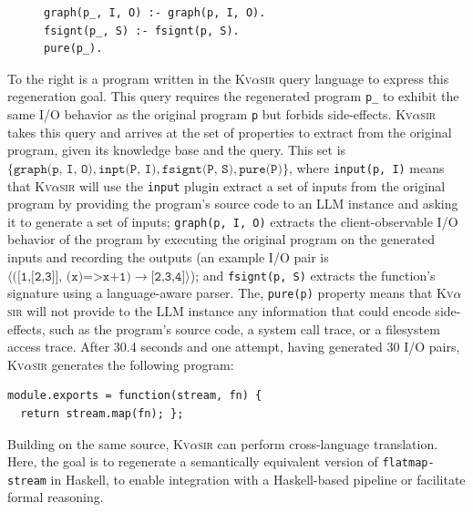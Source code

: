 \documentclass[nonacm,sigplan,review]{acmart}
\newcommand{\sys}{{\scshape Kv{$\alpha$}sir}\xspace}
\newcommand{\ttt}[1]{\texttt{#1}\xspace}
\begin{document}
\begin{figure}
\vspace{-10pt}
\hspace{-10pt}
\begin{verbatim}
graph(p_, I, O) :- graph(p, I, O).
fsignt(p_, S) :- fsignt(p, S).
pure(p_).
\end{verbatim}
\end{figure}
To the right is a program written in the \sys query language to express 
this regeneration goal.
This query requires the regenerated program \ttt{p\_} to exhibit the same I/O behavior as the original program \ttt{p}
but forbids side-effects.
\sys takes this query and arrives at the set of properties to extract from the
original program, given its knowledge base and the query.
This set is $\{\ttt{graph(p, I, O)}, \ttt{inpt(P, I)}, \ttt{fsignt(P, S)}, \ttt{pure(P)}\}$, where
\ttt{input(p, I)} means that \sys will use the \ttt{input} plugin extract a set of inputs from the original program
by providing the program's source code to an LLM instance and asking it to generate a set of inputs;
\ttt{graph(p, I, O)} extracts the client-observable I/O behavior of the program
by executing the original program on the generated inputs and recording the outputs
(an example I/O pair is $\langle\ttt{([1,[2,3]], (x)=>x+1)}\to\ttt{[2,3,4]}\rangle$);
and \ttt{fsignt(p, S)} extracts the function's signature using a language-aware parser.
The, \ttt{pure(p)} property means that \sys will not provide to the LLM 
instance any information that could encode side-effects, such as the
program's source code, a system call trace, or a filesystem access trace.
After 30.4 seconds and one attempt, having generated 30 I/O pairs, \sys generates the following program:
\begin{verbatim}
module.exports = function(stream, fn) {
  return stream.map(fn); };
\end{verbatim}

Building on the same source, \sys can perform cross-language
translation. 
Here, the goal is to regenerate a semantically equivalent version
of \ttt{flatmap-stream} in Haskell, to enable integration with a
Haskell-based pipeline or facilitate formal reasoning.
\end{document}
